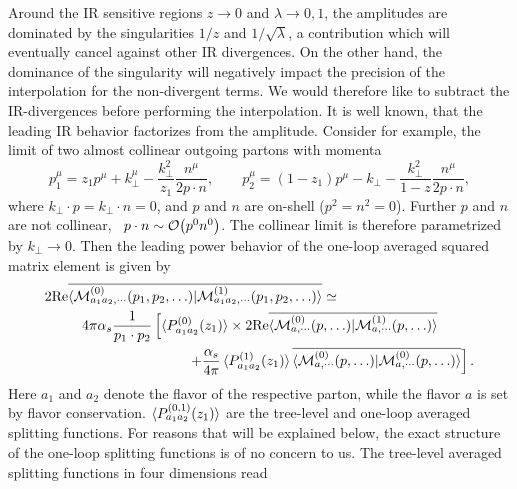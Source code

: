 Around the \acs{IR} sensitive regions $z \rightarrow 0$ and $\lambda \rightarrow 0, 1$, the amplitudes are dominated by the singularities $1/z$ and $1/\sqrt{\lambda}$, a contribution which will eventually cancel against other \acs{IR} divergences. On the other hand, the dominance of the singularity will negatively impact the precision of the interpolation for the non-divergent terms. We would therefore like to subtract the \acs{IR}-divergences before performing the interpolation. It is well known, that the leading \acs{IR} behavior factorizes from the amplitude. Consider for example, the limit of two almost collinear outgoing partons with momenta
\begin{equation}
p_1^\mu = z_1 p^\mu + k_\perp^\mu - \frac{k_\perp^2}{z_1} \frac{n^\mu}{2 p \cdot n}, \qquad p_2^\mu = (1 - z_1) p^\mu - k_\perp - \frac{k_\perp^2}{1 - z} \frac{n^\mu}{2 p \cdot n},
\end{equation}
where $k_\perp \cdot p = k_\perp \cdot n = 0$, and $p$ and $n$ are on-shell ($p^2 = n^2 = 0$). Further $p$ and $n$ are not collinear, \ie\ $p \cdot n \sim \mathcal{O}\!\left(p^0 n^0\right)$. The collinear limit is therefore parametrized by $k_\perp \rightarrow 0$. Then the leading power behavior of the one-loop averaged squared matrix element is given by
\begin{equation}
\begin{split}
2 \text{Re} &\overline{\braket{\mathcal{M}_{a_1 a_2,\cdots}^{(0)} (p_1, p_2, \ldots)| \mathcal{M}_{a_1 a_2,\cdots}^{(1)} (p_1, p_2, \ldots)}} \simeq \\
& \quad 4 \pi \alphas \frac{1}{p_1 \cdot p_2} \left[ \braket{P^{(0)}_{a_1 a_2}(z_1)} \times 2 \text{Re} \overline{\braket{\mathcal{M}_{a,\cdots}^{(0)} (p, \ldots)| \mathcal{M}_{a,\cdots}^{(1)} (p, \ldots)}} \right. \\
&\hspace{3cm} \left. + \frac{\alphas}{4 \pi} \braket{P^{(1)}_{a_1 a_2}(z_1)} \overline{\braket{\mathcal{M}_{a,\cdots}^{(0)} (p, \ldots)| \mathcal{M}_{a,\cdots}^{(0)} (p, \ldots)}} \right].
\end{split}
\label{eq:5:collinear_limit}
\end{equation}
Here $a_1$ and $a_2$ denote the flavor of the respective parton, while the flavor $a$ is set by flavor conservation. $\braket{P^{(0,1)}_{a_1 a_2}(z_1)}$ are the tree-level and one-loop averaged splitting functions. For reasons that will be explained below, the exact structure of the one-loop splitting functions is of no concern to us. The tree-level averaged splitting functions in four dimensions read
